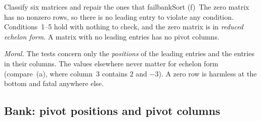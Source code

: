 \documentclass[11pt]{article}
\begin{document}
\begin{exmp}{Classify six matrices and repair the ones that fail}{bankSort}
(f)~The zero matrix has no nonzero rows, so there is no leading entry to violate any condition. Conditions~1--5 hold with nothing to check, and the zero matrix is in \emph{reduced echelon form}. A matrix with no leading entries has no pivot columns.

\emph{Moral.} The tests concern only the \emph{positions} of the leading entries and the entries in their columns. The values elsewhere never matter for echelon form (compare~(a), where column~3 contains $2$ and $-3$). A zero row is harmless at the bottom and fatal anywhere else.
\end{exmp}

\subsection*{Bank: pivot positions and pivot columns}
\end{document}
